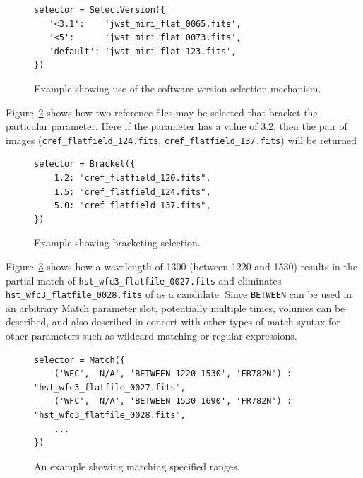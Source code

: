 \documentclass[final,authoryear,5p,times,twocolumn]{elsarticle}
\begin{document}
\begin{figure}
\begin{verbatim}
selector = SelectVersion({
   '<3.1':    'jwst_miri_flat_0065.fits',
   '<5':      'jwst_miri_flat_0073.fits',
   'default': 'jwst_miri_flat_123.fits',
})
\end{verbatim}
\caption{Example showing use of the software version selection mechanism.}
\label{fig:example2}
\end{figure}

Figure~\ref{fig:example3} shows how two reference files may be selected
that bracket the particular parameter. Here if the parameter has a value 
of 3.2, then the pair of images 
(\texttt{cref\_flatfield\_124.fits}, \texttt{cref\_flatfield\_137.fits}) will be returned

\begin{figure}
\begin{verbatim}
selector = Bracket({
    1.2: "cref_flatfield_120.fits",
    1.5: "cref_flatfield_124.fits",
    5.0: "cref_flatfield_137.fits",
})
\end{verbatim}
\caption{Example showing bracketing selection.}
\label{fig:example3}
\end{figure}

Figure~\ref{fig:example4} shows how a
wavelength of 1300 (between 1220 and 1530) results in the partial match 
of \texttt{hst\_wfc3\_flatfile\_0027.fits} and eliminates 
\texttt{hst\_wfc3\_flatfile\_0028.fits}
of as a candidate.   Since \texttt{BETWEEN}
can be used in an arbitrary Match parameter
slot,  potentially multiple times,  volumes can be described, and also
described in concert with other types of match syntax for other parameters
such as wildcard matching or regular expressions.

\begin{figure}
\begin{verbatim}
selector = Match({
    ('WFC', 'N/A', 'BETWEEN 1220 1530', 'FR782N') :  "hst_wfc3_flatfile_0027.fits",
    ('WFC', 'N/A', 'BETWEEN 1530 1690', 'FR782N') :  "hst_wfc3_flatfile_0028.fits",
    ...
})
\end{verbatim}
\caption{An example showing matching specified ranges.}
\label{fig:example4}
\end{figure}
\end{document}
